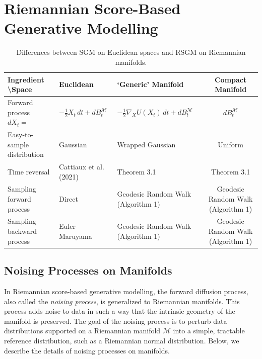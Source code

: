 \documentclass[a4paper,14pt]{article}
\theoremstyle{plain} %
\theoremstyle{definition} %
\theoremstyle{remark} %
\theoremstyle{definition}
\theoremstyle{remark}
\theoremstyle{remark}
\begin{document}
	\section{Riemannian Score-Based Generative Modelling}
	
	\begin{table}[htbp]
		\centering
		\scriptsize %
		\caption{Differences between SGM on Euclidean spaces and RSGM on Riemannian manifolds.}
		\begin{tabular}{@{}lllc@{}}
			\toprule
			\textbf{Ingredient \textbackslash Space} & \textbf{Euclidean} & \textbf{‘Generic’ Manifold} & \textbf{Compact Manifold} \\ 
			\midrule
			Forward process $dX_t =$                & $-\frac{1}{2}X_t \,dt + dB_t^\mathcal{M}$ 
			& $-\frac{1}{2}\nabla_X U(X_t)\,dt + dB_t^\mathcal{M}$ 
			& $dB_t^\mathcal{M}$ \\ 
			Easy-to-sample distribution             & Gaussian           & Wrapped Gaussian            & Uniform \\ 
			Time reversal                           & Cattiaux et al. (2021) 
			& Theorem 3.1        & Theorem 3.1 \\ 
			Sampling forward process                & Direct             & Geodesic Random Walk (Algorithm 1) 
			& Geodesic Random Walk (Algorithm 1) \\ 
			Sampling backward process               & Euler–Maruyama     & Geodesic Random Walk (Algorithm 1) 
			& Geodesic Random Walk (Algorithm 1) \\ 
			\bottomrule
		\end{tabular}
	\end{table}
	
	\subsection{Noising Processes on Manifolds}
	
	In Riemannian score-based generative modelling, the forward diffusion process, also called the \textit{noising process}, is generalized to Riemannian manifolds. This process adds noise to data in such a way that the intrinsic geometry of the manifold is preserved. The goal of the noising process is to perturb data distributions supported on a Riemannian manifold \( \mathcal{M} \) into a simple, tractable reference distribution, such as a Riemannian normal distribution. Below, we describe the details of noising processes on manifolds.
	
\end{document}
